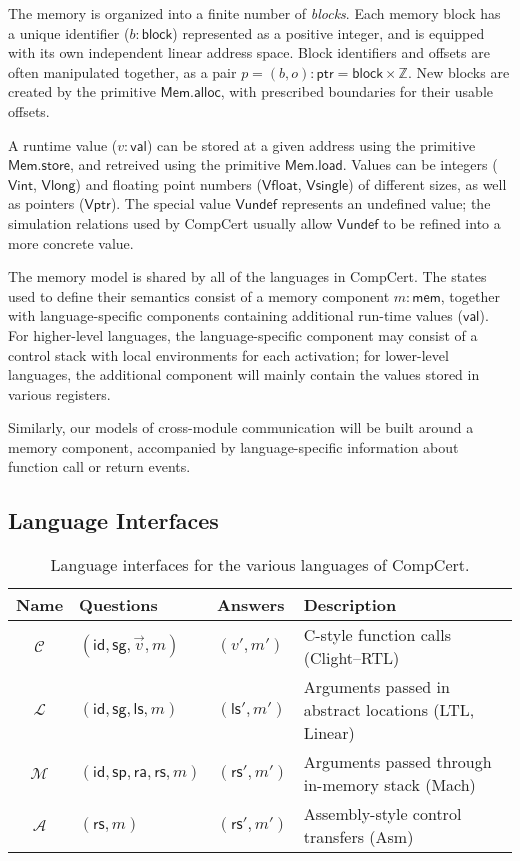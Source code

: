 \documentclass[acmsmall,timestamp,review,anonymous]{acmart}
\newcommand{\kw}[1]{\ensuremath{ \mathsf{#1} }}
\begin{document}
The memory is organized into a finite number of \emph{blocks}.
Each memory block has a unique identifier ($b : \kw{block}$)
represented as a positive integer,
and is equipped with its own independent linear address space.
Block identifiers and offsets are often manipulated together,
as a pair $p = (b, o) : \kw{ptr} = \kw{block} \times \mathbb{Z}$.
New blocks are created by the primitive $\kw{Mem.alloc}$,
with prescribed boundaries for their usable offsets.

A runtime value ($v : \kw{val}$) can be stored at
a given address using the primitive \kw{Mem.store},
and retreived using the primitive \kw{Mem.load}.
Values can be integers (\kw{Vint}, \kw{Vlong}) and
floating point numbers (\kw{Vfloat}, \kw{Vsingle})
of different sizes,
as well as pointers (\kw{Vptr}).
The special value \kw{Vundef}
represents an undefined value;
the simulation relations used by CompCert
usually allow $\kw{Vundef}$
to be refined into a more concrete value.

The memory model is shared by all of the languages in CompCert.
The states used to define their semantics consist of
a memory component $m : \kw{mem}$,
together with language-specific components
containing additional run-time values ($\kw{val}$).
For higher-level languages,
the language-specific component may consist of
a control stack with local environments for each activation;
for lower-level languages,
the additional component will mainly contain
the values stored in various registers.

Similarly,
our models of cross-module communication
will be built around a memory component,
accompanied by language-specific information
about function call or return events.


\subsection{Language Interfaces} \label{sec:compcert:li} %

\begin{table*} %
  \begin{tabular}{clll}
    \hline
    Name & Questions & Answers & Description \\
    \hline
    $\mathcal{C}$ & $(\kw{id}, \kw{sg}, \vec{v}, m)$ & $(v', m')$ &
      C-style function calls (Clight--RTL) \\
    $\mathcal{L}$ & $(\kw{id}, \kw{sg}, \kw{ls}, m)$ & $(\kw{ls}', m')$ &
      Arguments passed in abstract locations (LTL, Linear) \\
    $\mathcal{M}$ & $(\kw{id}, \kw{sp},\kw{ra},\kw{rs}, m)$ & $(\kw{rs}', m')$ &
      Arguments passed through in-memory stack (Mach) \\
    $\mathcal{A}$ & $(\kw{rs}, m)$ & $(\kw{rs}', m')$ &
      Assembly-style control transfers (Asm) \\
    \hline
  \end{tabular}
  \caption{Language interfaces for the various languages of CompCert.}
  \label{tbl:li}
\end{table*}
\end{document}
